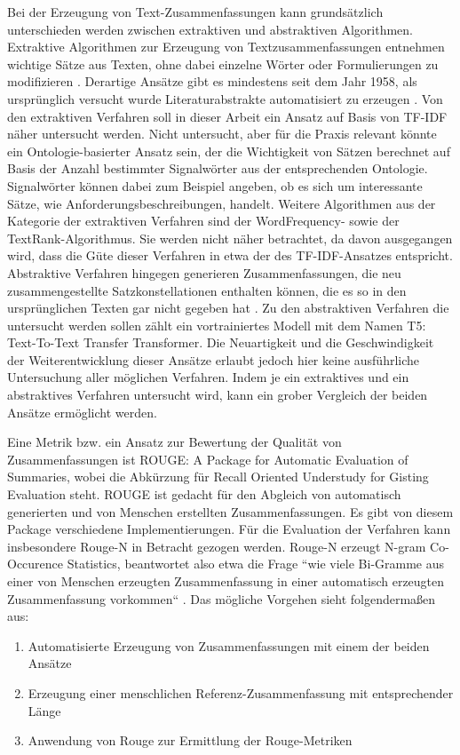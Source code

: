 Bei der Erzeugung von Text-Zusammenfassungen kann grundsätzlich unterschieden werden zwischen extraktiven und abstraktiven Algorithmen. Extraktive Algorithmen zur Erzeugung von Textzusammenfassungen entnehmen wichtige Sätze aus Texten, ohne dabei einzelne Wörter oder Formulierungen zu modifizieren \cite[S. 2]{allahyari}. Derartige Ansätze gibt es mindestens seit dem Jahr 1958, als ursprünglich versucht wurde Literaturabstrakte automatisiert zu erzeugen \cite{luhn}. Von den extraktiven Verfahren soll in dieser Arbeit ein Ansatz auf Basis von TF-IDF näher untersucht werden. Nicht untersucht, aber für die Praxis relevant könnte ein Ontologie-basierter Ansatz sein, der die Wichtigkeit von Sätzen berechnet auf Basis der Anzahl bestimmter Signalwörter aus der entsprechenden Ontologie. Signalwörter können dabei zum Beispiel angeben, ob es sich um interessante Sätze, wie Anforderungsbeschreibungen, handelt. Weitere Algorithmen aus der Kategorie der extraktiven Verfahren sind der WordFrequency- sowie der TextRank-Algorithmus. Sie werden nicht näher betrachtet, da davon ausgegangen wird, dass die Güte dieser Verfahren in etwa der des TF-IDF-Ansatzes entspricht. Abstraktive Verfahren hingegen generieren Zusammenfassungen, die neu zusammengestellte Satzkonstellationen enthalten können, die es so in den ursprünglichen Texten gar nicht gegeben hat \cite[S. 258]{Gupta}. Zu den abstraktiven Verfahren die untersucht werden sollen zählt ein vortrainiertes Modell mit dem Namen T5: Text-To-Text Transfer Transformer. 
Die Neuartigkeit und die Geschwindigkeit der Weiterentwicklung dieser Ansätze erlaubt jedoch hier keine ausführliche Untersuchung aller möglichen Verfahren. Indem je ein extraktives und ein abstraktives Verfahren untersucht wird, kann ein grober Vergleich der beiden Ansätze ermöglicht werden. 

Eine Metrik bzw. ein Ansatz zur Bewertung der Qualität von Zusammenfassungen ist ROUGE: A Package for Automatic Evaluation of Summaries, wobei die Abkürzung für Recall Oriented Understudy for Gisting Evaluation steht. ROUGE ist gedacht für den Abgleich von automatisch generierten und von Menschen erstellten Zusammenfassungen. Es gibt von diesem Package verschiedene Implementierungen. Für die Evaluation der Verfahren kann insbesondere Rouge-N in Betracht gezogen werden. Rouge-N erzeugt N-gram Co-Occurence Statistics, beantwortet also etwa die Frage ``wie viele Bi-Gramme aus einer von Menschen erzeugten Zusammenfassung in einer automatisch erzeugten Zusammenfassung vorkommen`` \cite{Lin}. Das mögliche Vorgehen sieht folgendermaßen aus: 
\begin{enumerate}
\item Automatisierte Erzeugung von Zusammenfassungen mit einem der beiden Ansätze
\item Erzeugung einer menschlichen Referenz-Zusammenfassung mit entsprechender Länge
\item Anwendung von Rouge zur Ermittlung der Rouge-Metriken 
\end{enumerate}

